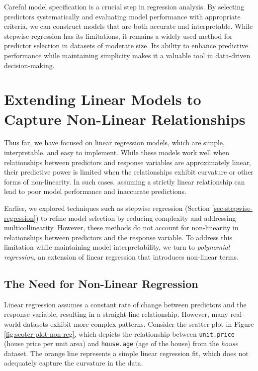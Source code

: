 \documentclass[
  11pt,
]{book}
\newcommand{\passthrough}[1]{#1}
\theoremstyle{definition}
\theoremstyle{definition}
\theoremstyle{definition}
\theoremstyle{definition}
\theoremstyle{remark}
\begin{document}
Careful model specification is a crucial step in regression analysis. By selecting predictors systematically and evaluating model performance with appropriate criteria, we can construct models that are both accurate and interpretable. While stepwise regression has its limitations, it remains a widely used method for predictor selection in datasets of moderate size. Its ability to enhance predictive performance while maintaining simplicity makes it a valuable tool in data-driven decision-making.

\section{Extending Linear Models to Capture Non-Linear Relationships}\label{extending-linear-models-to-capture-non-linear-relationships}

Thus far, we have focused on linear regression models, which are simple, interpretable, and easy to implement. While these models work well when relationships between predictors and response variables are approximately linear, their predictive power is limited when the relationships exhibit curvature or other forms of non-linearity. In such cases, assuming a strictly linear relationship can lead to poor model performance and inaccurate predictions.

Earlier, we explored techniques such as stepwise regression (Section \ref{sec-stepwise-regression}) to refine model selection by reducing complexity and addressing multicollinearity. However, these methods do not account for non-linearity in relationships between predictors and the response variable. To address this limitation while maintaining model interpretability, we turn to \emph{polynomial regression}, an extension of linear regression that introduces non-linear terms.

\subsection*{The Need for Non-Linear Regression}\label{the-need-for-non-linear-regression}


Linear regression assumes a constant rate of change between predictors and the response variable, resulting in a straight-line relationship. However, many real-world datasets exhibit more complex patterns. Consider the scatter plot in Figure \ref{fig:scoter-plot-non-reg}, which depicts the relationship between \passthrough{\lstinline!unit.price!} (house price per unit area) and \passthrough{\lstinline!house.age!} (age of the house) from the \emph{house} dataset. The orange line represents a simple linear regression fit, which does not adequately capture the curvature in the data.
\end{document}
